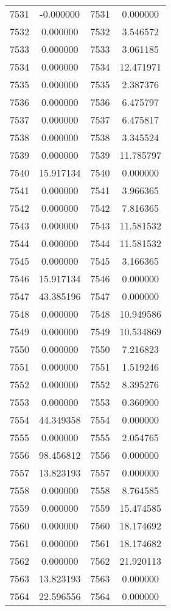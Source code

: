 \documentclass[12pt]{article}
\begin{document}
\begin{longtable}{@{}cccc@{}}
7531 & -0.000000 & 7531 & 0.000000 \\
7532 & 0.000000 & 7532 & 3.546572 \\
7533 & 0.000000 & 7533 & 3.061185 \\
7534 & 0.000000 & 7534 & 12.471971 \\
7535 & 0.000000 & 7535 & 2.387376 \\
7536 & 0.000000 & 7536 & 6.475797 \\
7537 & 0.000000 & 7537 & 6.475817 \\
7538 & 0.000000 & 7538 & 3.345524 \\
7539 & 0.000000 & 7539 & 11.785797 \\
7540 & 15.917134 & 7540 & 0.000000 \\
7541 & 0.000000 & 7541 & 3.966365 \\
7542 & 0.000000 & 7542 & 7.816365 \\
7543 & 0.000000 & 7543 & 11.581532 \\
7544 & 0.000000 & 7544 & 11.581532 \\
7545 & 0.000000 & 7545 & 3.166365 \\
7546 & 15.917134 & 7546 & 0.000000 \\
7547 & 43.385196 & 7547 & 0.000000 \\
7548 & 0.000000 & 7548 & 10.949586 \\
7549 & 0.000000 & 7549 & 10.534869 \\
7550 & 0.000000 & 7550 & 7.216823 \\
7551 & 0.000000 & 7551 & 1.519246 \\
7552 & 0.000000 & 7552 & 8.395276 \\
7553 & 0.000000 & 7553 & 0.360900 \\
7554 & 44.349358 & 7554 & 0.000000 \\
7555 & 0.000000 & 7555 & 2.054765 \\
7556 & 98.456812 & 7556 & 0.000000 \\
7557 & 13.823193 & 7557 & 0.000000 \\
7558 & 0.000000 & 7558 & 8.764585 \\
7559 & 0.000000 & 7559 & 15.474585 \\
7560 & 0.000000 & 7560 & 18.174692 \\
7561 & 0.000000 & 7561 & 18.174682 \\
7562 & 0.000000 & 7562 & 21.920113 \\
7563 & 13.823193 & 7563 & 0.000000 \\
7564 & 22.596556 & 7564 & 0.000000 \\

\end{longtable}
\end{document}
